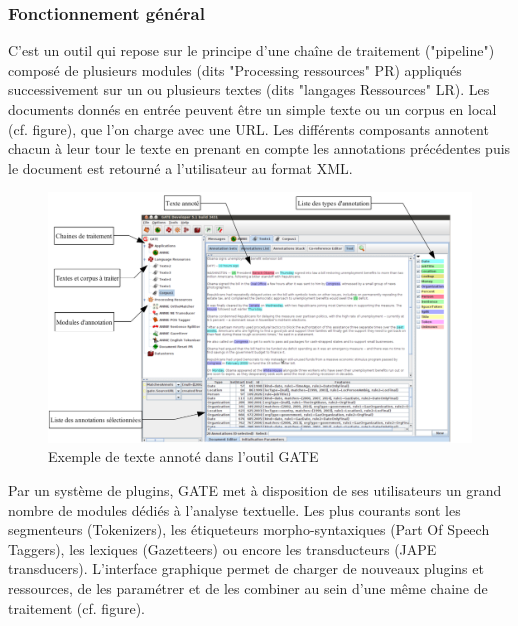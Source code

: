 \documentclass[a4paper, 11pt]{report}
\begin{document}
\subsubsection{Fonctionnement général}
C'est un outil qui repose sur le principe d'une chaîne de traitement ("pipeline") composé de plusieurs modules (dits "Processing ressources" PR) appliqués successivement sur un ou plusieurs textes (dits "langages Ressources" LR). Les documents donnés en entrée peuvent être un simple texte ou un corpus en local (cf. figure), que l'on charge avec une URL. Les différents composants annotent chacun à leur tour le texte en prenant en compte les annotations précédentes puis le document est retourné a l'utilisateur au format XML.
\begin{figure}[h]
\begin{center}
\includegraphics[scale=0.3]{img/exempleAnnotationGATE.png} 
\end{center}
\caption{Exemple de texte annoté dans l'outil GATE}
\end{figure}
Par un système de plugins, GATE met à disposition de ses utilisateurs un grand nombre de
modules dédiés à l'analyse textuelle. Les plus courants sont les segmenteurs (Tokenizers), les
étiqueteurs morpho-syntaxiques (Part Of Speech Taggers), les lexiques (Gazetteers) ou encore les
transducteurs (JAPE transducers). L'interface graphique permet de charger de nouveaux plugins et
ressources, de les paramétrer et de les combiner au sein d'une même chaine de traitement (cf. figure).
\end{document}
